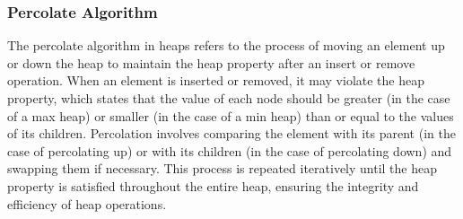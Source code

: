 \subsubsection{Percolate Algorithm}

The percolate algorithm in heaps refers to the process of moving an element up or down the heap to maintain the heap property after an insert or remove operation. When an element is inserted or removed, it may 
violate the heap property, which states that the value of each node should be greater (in the case of a max heap) or smaller (in the case of a min heap) than or equal to the values of its children. Percolation 
involves comparing the element with its parent (in the case of percolating up) or with its children (in the case of percolating down) and swapping them if necessary. This process is repeated iteratively until 
the heap property is satisfied throughout the entire heap, ensuring the integrity and efficiency of heap operations.

